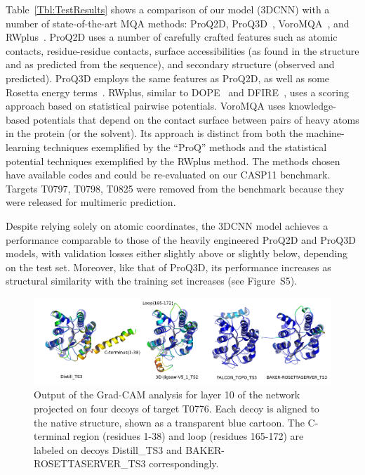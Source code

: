 \documentclass{bioinfo}
\begin{document}
Table~\ref{Tbl:TestResults} shows a comparison of our model (3DCNN)
with a number of state-of-the-art MQA methods: ProQ2D,
ProQ3D~\citep{uziela2017proq3d},
VoroMQA~\citep{olechnovivc2017voromqa}, and
RWplus~\citep{zhang2010novel}.
%
ProQ2D uses a number of carefully crafted features such as atomic
contacts, residue-residue contacts, surface accessibilities (as found
in the structure and as predicted from the sequence), and secondary
structure (observed and predicted). ProQ3D employs the same features
as ProQ2D, as well as some Rosetta energy
terms~\citep{leaverfay2011rosetta}.
%
RWplus, similar to DOPE~\citep{shen2006statistical} and
DFIRE~\citep{zhou2002distance}, uses a scoring approach based on
statistical pairwise potentials.
%
VoroMQA uses knowledge-based potentials that depend on the contact
surface between pairs of heavy atoms in the protein (or the
solvent). Its approach is distinct from both the machine-learning
techniques exemplified by the ``ProQ'' methods and the statistical
potential techniques exemplified by the RWplus method.
%
The methods chosen have available codes and could be re-evaluated on
our CASP11 benchmark. Targets T0797, T0798, T0825 were removed from
the benchmark because they were released for multimeric prediction.

Despite relying solely on atomic coordinates, the 3DCNN model achieves
a performance comparable to those of the heavily engineered ProQ2D and
ProQ3D models, with validation losses either slightly above or
slightly below, depending on the test set. Moreover, like that of
ProQ3D, its performance increases as structural similarity with the
training set increases (see Figure~S5).


\begin{figure}[!t]
    \centerline{\includegraphics[width=0.8\linewidth]{image7.png}}
    \caption{Output of the Grad-CAM analysis for layer 10 of the
      network projected on four decoys of target T0776. Each decoy is
      aligned to the native structure, shown as a transparent blue
      cartoon. The C-terminal region (residues 1-38) and loop (residues 165-172) 
      are labeled on decoys Distill\_TS3 and BAKER-ROSETTASERVER\_TS3 correspondingly.}
    \label{Fig:GradCAMT0776_more}
\end{figure}
\end{document}
